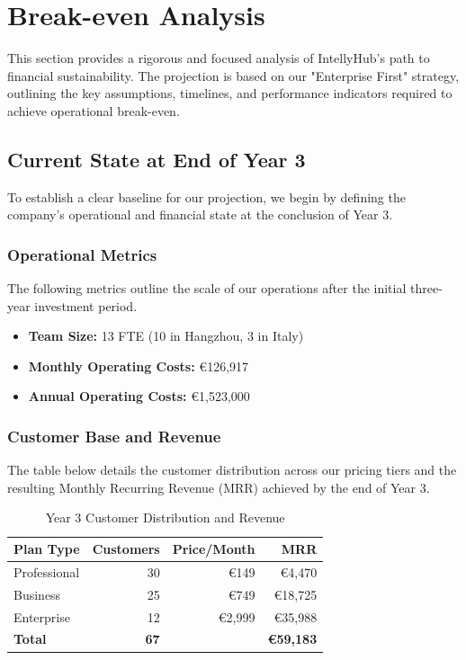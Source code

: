 \documentclass[11pt, a4paper, oneside]{article}
\begin{document}
\newpage
\section{Break-even Analysis}
This section provides a rigorous and focused analysis of IntellyHub's path to financial sustainability. The projection is based on our "Enterprise First" strategy, outlining the key assumptions, timelines, and performance indicators required to achieve operational break-even.

\subsection{Current State at End of Year 3}
To establish a clear baseline for our projection, we begin by defining the company's operational and financial state at the conclusion of Year 3.

\subsubsection{Operational Metrics}
The following metrics outline the scale of our operations after the initial three-year investment period.
\begin{itemize}
    \item \textbf{Team Size:} 13 FTE (10 in Hangzhou, 3 in Italy)
    \item \textbf{Monthly Operating Costs:} \euro{126,917}
    \item \textbf{Annual Operating Costs:} \euro{1,523,000}
\end{itemize}

\subsubsection{Customer Base and Revenue}
The table below details the customer distribution across our pricing tiers and the resulting Monthly Recurring Revenue (MRR) achieved by the end of Year 3.
\begin{table}[H]
    \centering
    \caption{Year 3 Customer Distribution and Revenue}
    \begin{tabular}{lrrr}
    \toprule
    \textbf{Plan Type} & \textbf{Customers} & \textbf{Price/Month} & \textbf{MRR} \\
    \midrule
    Professional & 30 & \euro{149} & \euro{4,470} \\
    Business & 25 & \euro{749} & \euro{18,725} \\
    Enterprise & 12 & \euro{2,999} & \euro{35,988} \\
    \midrule
    \textbf{Total} & \textbf{67} & & \textbf{\euro{59,183}} \\
    \bottomrule
    \end{tabular}
\end{table}
\end{document}
